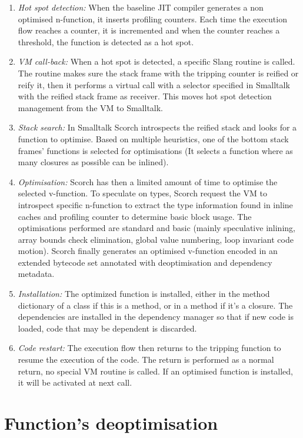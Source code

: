 \documentclass[a4paper,12pt,twoside]{../includes/ThesisStyle}
\begin{document}
\begin{enumerate}
	\item \emph{Hot spot detection:} When the baseline JIT compiler generates a non optimised n-function, it inserts profiling counters. Each time the execution flow reaches a counter, it is incremented and when the counter reaches a threshold, the function is detected as a hot spot.
	\item \emph{VM call-back:} When a hot spot is detected, a specific Slang routine is called. The routine makes sure the stack frame with the tripping counter is reified or reify it, then it performs a virtual call with a selector specified in Smalltalk with the reified stack frame as receiver. This moves hot spot detection management from the VM to Smalltalk.
	\item \emph{Stack search:} In Smalltalk Scorch introspects the reified stack and looks for a function to optimise. Based on multiple heuristics, one of the bottom stack frames' functions is selected for optimisations (It selects a function where as many closures as possible can be inlined).
	\item \emph{Optimisation:} Scorch has then a limited amount of time to optimise the selected v-function. To speculate on types, Scorch request the VM to introspect specific n-function to extract the type information found in inline caches and profiling counter to determine basic block usage. The optimisations performed are standard and basic (mainly speculative inlining, array bounds check elimination, global value numbering, loop invariant code motion). Scorch finally generates an optimised v-function encoded in an extended bytecode set annotated with deoptimisation and dependency metadata.
	\item \emph{Installation:} The optimized function is installed, either in the method dictionary of a class if this is a method, or in a method if it's a closure. The dependencies are installed in the dependency manager so that if new code is loaded, code that may be dependent is discarded.
	\item \emph{Code restart:} The execution flow then returns to the tripping function to resume the execution of the code. The return is performed as a normal return, no special VM routine is called. If an optimised function is installed, it will be activated at next call.
\end{enumerate}




\section {Function's deoptimisation}
\end{document}
